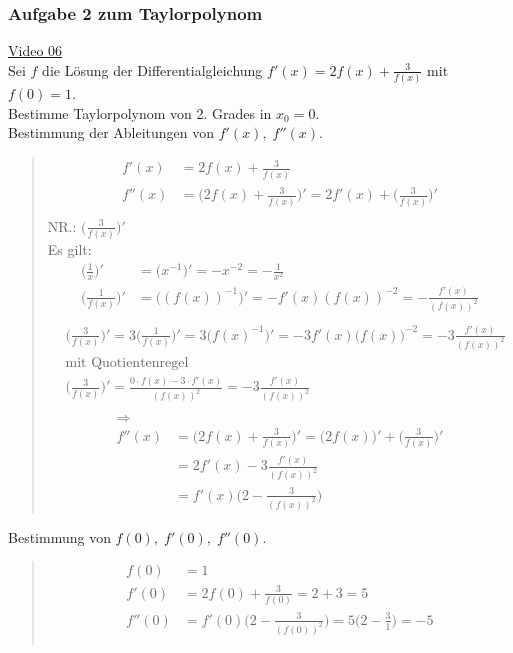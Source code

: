\subsubsection{Aufgabe 2 zum Taylorpolynom}
\href{https://youtu.be/uHJAzrQ-4-I}{Video 06}\\
Sei $ f $ die Lösung der Differentialgleichung $ f'(x)=2f(x)+\frac{3}{f(x)} $ mit $ f(0)=1 $.\\
Bestimme Taylorpolynom von 2. Grades in $ x_0=0 $.\vspace*{2mm}\\
\newpage
\noindent
\textbullet \;\;Bestimmung der Ableitungen von  $ f'(x),\;f''(x)$.\\
\begin{quote}
\begin{align*}
f'(x)&=2f(x)+\frac{3}{f(x)}\\
f''(x)&=\bigg(2f(x)+\frac{3}{f(x)}\bigg)'=2f'(x)+\bigg(\frac{3}{f(x)}\bigg)'\\
\end{align*}
NR.: $\bigg(\frac{3}{f(x)}\bigg)'  $\\
Es gilt:\\
\begin{align*}
\bigg(\frac{1}{x}\bigg)'&=\bigg(x^{-1}\bigg)'=-x^{-2}=-\frac{1}{x^2}\\
\bigg(\frac{1}{f(x)}\bigg)'&=\bigg((f(x))^{-1}\bigg)'=-f'(x)(f(x))^{-2}=-\frac{f'(x)}{(f(x))^2}\\
\end{align*}
\begin{align*}
&\bigg(\frac{3}{f(x)}\bigg)'=3\bigg(\frac{1}{f(x)}\bigg)'=3\big(f(x)^{-1}\big )'=-3f'(x)\big ( f(x)\big)^{-2}=-3\frac{f'(x)}{(f(x))^2}\\
&\text{mit Quotientenregel }\\
&\bigg(\frac{3}{f(x)}\bigg)'=\frac{0\cdot f(x)-3\cdot f'(x)}{(f(x))^2}=-3\frac{f'(x)}{(f(x))^2}\\
\end{align*}
\begin{align*}
\Rightarrow\\
f''(x)&=\bigg(2f(x)+\frac{3}{f(x)}\bigg)'=\bigg(2f(x)\bigg)'+\bigg(\frac{3}{f(x)}\bigg)'\\
&=2f'(x)-3\frac{f'(x)}{(f(x))^2}\\
&=f'(x)\bigg (2-\frac{3}{(f(x))^2}\bigg)
\end{align*}
\end{quote}
\textbullet\;\; Bestimmung von $ f(0),\; f'(0),\; f''(0) $.\\
\begin{quote}
\begin{align*}
f(0)&=1\\
f'(0)&=2f(0)+\frac{3}{f(0)}=2+3=5\\
f''(0)&=f'(0)\bigg (2-\frac{3}{(f(0))^2}\bigg)=5\bigg (2-\frac{3}{1}\bigg)=-5\\
\end{align*}
\end{quote}
